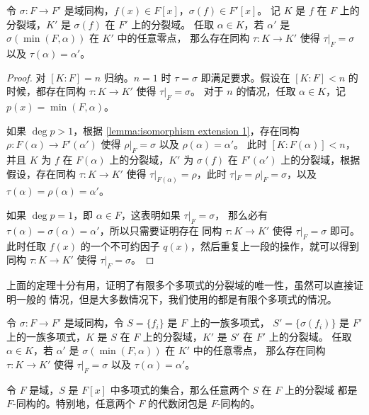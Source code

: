 \begin{theorem}[同构延拓定理 2]\label{thm:isomorphism extension 2}
  令 $\sigma:F\to F'$ 是域同构，$f(x)\in F[x]$，$\sigma(f)\in F'[x]$。
  记 $K$ 是 $f$ 在 $F$ 上的分裂域，$K'$ 是 $\sigma(f)$ 在 $F'$ 上的分裂域。
  任取 $\alpha\in K$，若 $\alpha'$ 是 $\sigma(\min(F,\alpha))$ 在 $K'$ 中的任意零点，
  那么存在同构 $\tau:K\to K'$ 使得 $\tau|_F=\sigma$ 以及 $\tau(\alpha)=\alpha'$。
\end{theorem}
\begin{proof}
  对 $[K:F]=n$ 归纳。$n=1$ 时 $\tau=\sigma$ 即满足要求。假设在 $[K:F]<n$
  的时候，都存在同构 $\tau:K\to K'$ 使得 $\tau|_F=\sigma$。
  对于 $n$ 的情况，任取 $\alpha\in K$，记 $p(x)=\min(F,\alpha)$。
  
  如果 $\deg p>1$，根据 \autoref{lemma:isomorphism extension 1}，存在同构
  $\rho:F(\alpha)\to F'(\alpha')$ 使得 $\rho|_F=\sigma$ 以及 $\rho(\alpha)=\alpha'$。
  此时 $[K:F(\alpha)]<n$，并且 $K$ 为 $f$ 在 $F(\alpha)$ 上的分裂域，$K'$
  为 $\sigma(f)$ 在 $F'(\alpha')$ 上的分裂域，根据假设，存在同构 $\tau:K\to K'$
  使得 $\tau|_{F(\alpha)}=\rho$，此时 $\tau|_F=\rho|_F=\sigma$，以及
  $\tau(\alpha)=\rho(\alpha)=\alpha'$。

  如果 $\deg p=1$，即 $\alpha\in F$，这表明如果 $\tau|_F=\sigma$，
  那么必有 $\tau(\alpha)=\sigma(\alpha)=\alpha'$，所以只需要证明存在
  同构 $\tau:K\to K'$ 使得 $\tau|_F=\sigma$ 即可。此时任取
  $f(x)$ 的一个不可约因子 $q(x)$，然后重复上一段的操作，就可以得到同构
  $\tau:K\to K'$ 使得 $\tau|_F=\sigma$。
\end{proof}

上面的定理十分有用，证明了有限多个多项式的分裂域的唯一性，虽然可以直接证明一般的
情况，但是大多数情况下，我们使用的都是有限个多项式的情况。

\begin{theorem}[同构延拓定理 3]
  令 $\sigma:F\to F'$ 是域同构，令 $S=\{f_i\}$ 是 $F$ 上的一族多项式，
  $S'=\{\sigma(f_i)\}$ 是 $F'$ 上的一族多项式，$K$ 是 $S$ 在 $F$
  上的分裂域，$K'$ 是 $S'$ 在 $F'$ 上的分裂域。
  任取 $\alpha\in K$，若 $\alpha'$ 是 $\sigma(\min(F,\alpha))$ 在 $K'$ 中的任意零点，
  那么存在同构 $\tau:K\to K'$ 使得 $\tau|_F=\sigma$ 以及 $\tau(\alpha)=\alpha'$。
\end{theorem}

\begin{corollary}
  令 $F$ 是域，$S$ 是 $F[x]$ 中多项式的集合，那么任意两个 $S$ 在 $F$ 上的分裂域
  都是 $F$-同构的。特别地，任意两个 $F$ 的代数闭包是 $F$-同构的。
\end{corollary}

